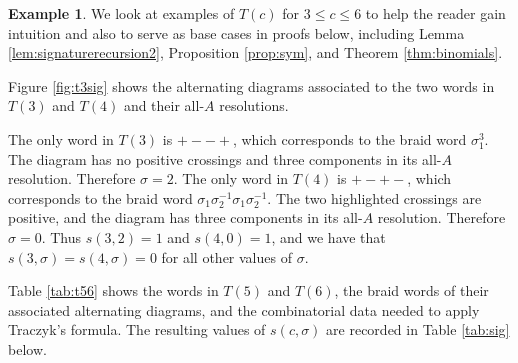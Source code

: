 \documentclass[12pt]{amsart}
\theoremstyle{definition}
\newtheorem{example}[theorem]{Example}
\theoremstyle{remark}
\numberwithin{equation}{section}
\begin{document}
\begin{example}
\label{ex:basecases}
We look at examples of $T(c)$ for $3\leq c \leq 6$ to help the reader gain intuition and also to serve as base cases in proofs below, including Lemma \ref{lem:signaturerecursion2}, Proposition \ref{prop:sym}, and Theorem \ref{thm:binomials}.

Figure \ref{fig:t3sig} shows the alternating diagrams associated to the two words in $T(3)$ and $T(4)$ and their all-$A$ resolutions. 

The only word in $T(3)$ is $+--+$, which corresponds to the braid word $\sigma_1^3$. The diagram has no positive crossings and three components in its all-$A$ resolution. Therefore $\sigma=2$. The only word in $T(4)$ is $+-+-$, which corresponds to the braid word $\sigma_1 \sigma_2^{-1}\sigma_1\sigma_2^{-1}$. The two highlighted crossings are positive, and the diagram has three components in its all-$A$ resolution. Therefore $\sigma=0$. Thus $s(3,2)=1$ and $s(4,0)=1$, and we have that $s(3,\sigma)=s(4,\sigma)=0$ for all other values of $\sigma$.


Table \ref{tab:t56} shows the words in $T(5)$ and $T(6)$, the braid words of their associated alternating diagrams, and the combinatorial data needed to apply Traczyk's formula. The resulting values of $s(c,\sigma)$ are recorded in Table \ref{tab:sig} below.
\end{example}
\end{document}
